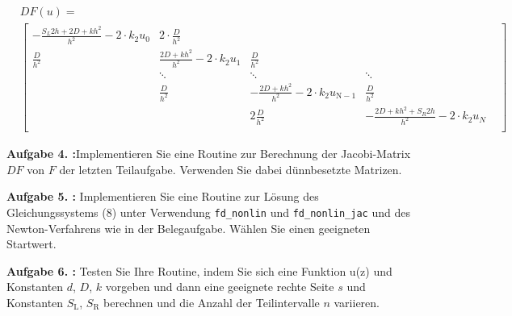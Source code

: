\begin{align}
	 & DF(u)\mathrm=                                                  \\
	 & \begin{bmatrix}
		   -	\frac{S_L2h+2D+kh^2}{h^2}-2\cdot k_2u_0 &
		   2\cdot \frac{D}{h^2}                     &                                                                              \\
		   \frac{D}{h^2}                            & \frac{2D+kh^2}{h^2}-2\cdot k_2
		   u_\mathrm{1}                             & \frac{D}{h^2}                                                                \\
		                                            & \ddots                         & \ddots                           & \ddots & \\
		                                            & \frac{D}{h^2}                  & - \frac{2D+kh^2}{h^2}-2\cdot k_2
		   u_\mathrm{N-1}                           & \frac{D}{h^2}                                                                \\
		                                            &                                & 2\frac{D}{h^2}                   &
		   -\frac{2D+kh^2+S_R2h}{h^2}-2\cdot k_2u_N                                                                                \\
	   \end{bmatrix}
\end{align}

\begin{mybox}
	\textbf{Aufgabe 4. :}Implementieren Sie eine Routine zur Berechnung der
	Jacobi-Matrix $DF$ von $F$ der letzten Teilaufgabe.
	Verwenden Sie dabei dünnbesetzte Matrizen.
\end{mybox}



\begin{mybox}
	\textbf{Aufgabe 5. :}
	Implementieren Sie eine Routine zur Lösung des Gleichungssystems (8)
	unter Verwendung \verb*|fd_nonlin|
	und \verb*|fd_nonlin_jac| und des Newton-Verfahrens wie in der
	Belegaufgabe. Wählen Sie einen geeigneten
	Startwert.
\end{mybox}

\begin{mybox}
	\textbf{Aufgabe 6. :} Testen Sie Ihre Routine, indem Sie sich eine Funktion u(z) und Konstanten $d$, $D$, $k$ vorgeben und
	dann eine geeignete rechte Seite $s$ und Konstanten $S_\mathrm{L}$, $S_\mathrm{R}$ berechnen und die Anzahl der Teilintervalle
	$n$ variieren.
\end{mybox}

